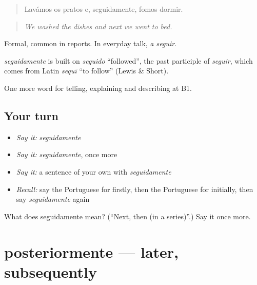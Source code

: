 \begin{quote}
Lavámos os pratos e, seguidamente, fomos dormir.
\end{quote}

\begin{quote}
\emph{We washed the dishes and next we went to bed.}
\end{quote}

Formal, common in reports. In everyday talk, \emph{a seguir}.

\begin{cousinweb}
\emph{seguidamente} is built on \emph{seguido} \textquotedblleft{}followed\textquotedblright{}, the past participle of \emph{seguir}, which comes from Latin \emph{sequī} \textquotedblleft{}to follow\textquotedblright{} (Lewis \& Short).
\end{cousinweb}

\begin{grammarlens}[title={What you've built}]
One more word for telling, explaining and describing at B1.
\end{grammarlens}

\subsection*{Your turn}
\begin{itemize}
\raggedright
  \item \emph{Say it:} \emph{seguidamente}
  \item \emph{Say it:} \emph{seguidamente}, once more
  \item \emph{Say it:} a sentence of your own with \emph{seguidamente}
  \item \emph{Recall:} say the Portuguese for firstly, then the Portuguese for initially, then say \emph{seguidamente} again
\end{itemize}

\begin{tcolorbox}[breakable,colback=teal!4,colframe=teal!35!black,title={Before you move on}]
What does seguidamente mean? (\textquotedblleft{}Next, then (in a series)\textquotedblright{}.) Say it once more.
\end{tcolorbox}
\section[posteriormente]{posteriormente — later, subsequently}

\label{lesson:PT-C269-posteriormente}



